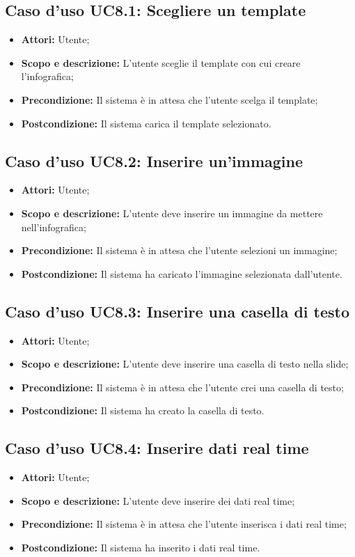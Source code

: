 \subsection{Caso d'uso UC8.1: Scegliere un template}
\begin{itemize}
	\item \textbf{Attori:} Utente;
	\item \textbf{Scopo e descrizione:} L'utente sceglie il template con cui creare l'infografica;
	\item \textbf{Precondizione:} Il sistema è in attesa che l'utente scelga il template;
	\item \textbf{Postcondizione:} Il sistema carica il template selezionato.
\end{itemize}


\subsection{Caso d'uso UC8.2: Inserire un'immagine}
\begin{itemize}
\item \textbf{Attori:} Utente;
\item \textbf{Scopo e descrizione:} L'utente deve inserire un immagine da mettere nell'infografica;
\item \textbf{Precondizione:} Il sistema è in attesa che l'utente selezioni un immagine;
\item \textbf{Postcondizione:} Il sistema ha caricato l'immagine selezionata dall'utente.
\end{itemize}


\subsection{Caso d'uso UC8.3: Inserire una casella di testo}
\begin{itemize}
\item \textbf{Attori:} Utente;
\item \textbf{Scopo e descrizione:} L'utente deve inserire una casella di testo nella slide;
\item \textbf{Precondizione:} Il sistema è in attesa che l'utente crei una casella di testo;
\item \textbf{Postcondizione:} Il sistema ha creato la casella di testo.
\end{itemize}


\subsection{Caso d'uso UC8.4: Inserire dati real time}
\begin{itemize}
	\item \textbf{Attori:} Utente;
	\item \textbf{Scopo e descrizione:} L'utente deve inserire dei dati \gls{real time};
	\item \textbf{Precondizione:} Il sistema è in attesa che l'utente inserisca i dati \gls{real time};
	\item \textbf{Postcondizione:} Il sistema ha inserito i dati \gls{real time}.
\end{itemize}

